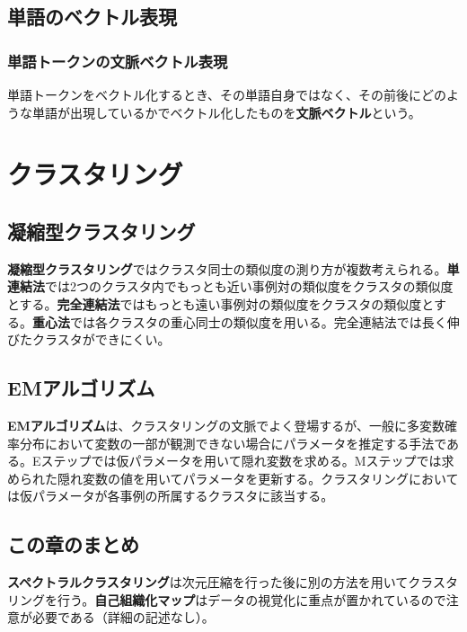 \documentclass{jsarticle}
\begin{document}
\subsection{単語のベクトル表現}

\subsubsection{単語トークンの文脈ベクトル表現}

単語トークンをベクトル化するとき、その単語自身ではなく、その前後にどのような単語が出現しているかでベクトル化したものを\textbf{文脈ベクトル}という。

\section{クラスタリング}

\setcounter{subsection}{1}
\subsection{凝縮型クラスタリング}

\textbf{凝縮型クラスタリング}ではクラスタ同士の類似度の測り方が複数考えられる。\textbf{単連結法}では2つのクラスタ内でもっとも近い事例対の類似度をクラスタの類似度とする。\textbf{完全連結法}ではもっとも遠い事例対の類似度をクラスタの類似度とする。\textbf{重心法}では各クラスタの重心同士の類似度を用いる。完全連結法では長く伸びたクラスタができにくい。

\setcounter{subsection}{4}
\subsection{EMアルゴリズム}

\textbf{EMアルゴリズム}は、クラスタリングの文脈でよく登場するが、一般に多変数確率分布において変数の一部が観測できない場合にパラメータを推定する手法である。Eステップでは仮パラメータを用いて隠れ変数を求める。Mステップでは求められた隠れ変数の値を用いてパラメータを更新する。クラスタリングにおいては仮パラメータが各事例の所属するクラスタに該当する。

\setcounter{subsection}{6}
\subsection{この章のまとめ}

\textbf{スペクトラルクラスタリング}は次元圧縮を行った後に別の方法を用いてクラスタリングを行う。\textbf{自己組織化マップ}はデータの視覚化に重点が置かれているので注意が必要である（詳細の記述なし）。
\end{document}
